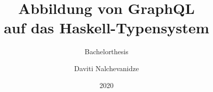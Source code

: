 \documentclass[aspectratio=169,t,xcolor=table]{beamer}
\begin{document}
\title[Inf UFG]{Abbildung von GraphQL \\ auf das Haskell-Typensystem}
\subtitle{Bachelorthesis}

\author{Daviti Nalchevanidze}

\date{2020}
\frame[noframenumbering]{\titlepage}





\titlepage


\end{document}
